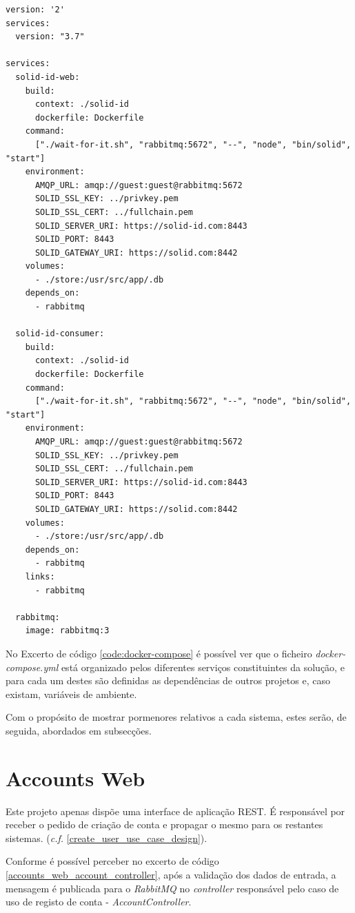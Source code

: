 \begin{lstlisting}[language=docker-compose-2,caption={Ficheiro \emph{docker-compose.yml}},breaklines=true,label={code:docker-compose}]
version: '2'
services:
  version: "3.7"

services:
  solid-id-web:
    build:
      context: ./solid-id
      dockerfile: Dockerfile
    command:
      ["./wait-for-it.sh", "rabbitmq:5672", "--", "node", "bin/solid", "start"]
    environment:
      AMQP_URL: amqp://guest:guest@rabbitmq:5672
      SOLID_SSL_KEY: ../privkey.pem
      SOLID_SSL_CERT: ../fullchain.pem
      SOLID_SERVER_URI: https://solid-id.com:8443
      SOLID_PORT: 8443
      SOLID_GATEWAY_URI: https://solid.com:8442
    volumes:
      - ./store:/usr/src/app/.db
    depends_on:
      - rabbitmq

  solid-id-consumer:
    build:
      context: ./solid-id
      dockerfile: Dockerfile
    command:
      ["./wait-for-it.sh", "rabbitmq:5672", "--", "node", "bin/solid", "start"]
    environment:
      AMQP_URL: amqp://guest:guest@rabbitmq:5672
      SOLID_SSL_KEY: ../privkey.pem
      SOLID_SSL_CERT: ../fullchain.pem
      SOLID_SERVER_URI: https://solid-id.com:8443
      SOLID_PORT: 8443
      SOLID_GATEWAY_URI: https://solid.com:8442
    volumes:
      - ./store:/usr/src/app/.db
    depends_on:
      - rabbitmq
    links:
      - rabbitmq

  rabbitmq:
    image: rabbitmq:3

\end{lstlisting}

No Excerto de código \ref{code:docker-compose} é possível ver que o ficheiro \emph{docker-compose.yml} está organizado pelos diferentes serviços constituintes da solução, e para cada um destes são definidas as dependências de outros projetos e, caso existam, variáveis de ambiente.

Com o propósito de mostrar pormenores relativos a cada sistema, estes serão, de seguida, abordados em subsecções.

\section{Accounts Web}
Este projeto apenas dispõe uma interface de aplicação REST. É responsável por receber o pedido de criação de conta e propagar o mesmo para os restantes sistemas. (\emph{c.f.} \ref{create_user_use_case_design}).

Conforme é possível perceber no excerto de código \ref{accounts_web_account_controller}, após a validação dos dados de entrada, a mensagem é publicada para o \emph{RabbitMQ} no \emph{controller} responsável pelo caso de uso de registo de conta - \emph{AccountController}.

